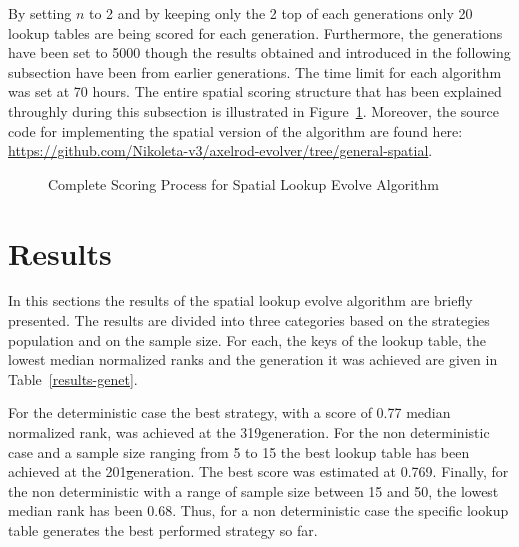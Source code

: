 By setting \(n\) to 2 and by keeping only the 2 top of each generations only
20 lookup tables are being scored for each generation. Furthermore, the generations
have been set to 5000 though the results obtained and introduced in the following
subsection have been from earlier generations. The time limit for each algorithm
was set at 70 hours. The entire spatial scoring structure that
has been explained throughly during this subsection is illustrated in Figure~\ref{fig:spatial-evolve}.
Moreover, the source code for implementing the spatial version of the algorithm
are found here: \url{https://github.com/Nikoleta-v3/axelrod-evolver/tree/general-spatial}.

\begin{figure}[H]
		
		\caption{Complete Scoring Process for Spatial Lookup Evolve Algorithm}
  \label{fig:spatial-evolve}
\end{figure}

\section{Results}
In this sections the results of the spatial lookup evolve algorithm are briefly
presented. The results are divided into three categories based on the strategies
population and on the sample size. For each, the keys of the lookup table,
the lowest median normalized ranks and the generation it was achieved are given
in Table~\ref{results-genet}.

For the deterministic case the best strategy, with a score of 0.77 median normalized
rank, was achieved at the 319\nth generation. For the non deterministic case
and a sample size ranging from 5 to 15 the best lookup table has been achieved at
the 201\st generation. The best score was estimated at 0.769. Finally, for the
non deterministic with a range of sample size between 15 and 50, the lowest median rank has been 0.68.
Thus, for a non deterministic case the specific lookup table generates the best performed strategy so far.

